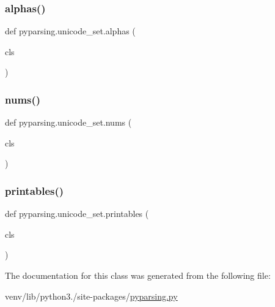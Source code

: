 \mbox{\label{classpyparsing_1_1unicode__set_aa9f08ce787c5c12b9a421680e743eacc}} 
\subsubsection{\texorpdfstring{alphas()}{alphas()}}
{\footnotesize\ttfamily def pyparsing.\+unicode\+\_\+set.\+alphas (\begin{DoxyParamCaption}\item[{}]{cls }\end{DoxyParamCaption})}

\mbox{\label{classpyparsing_1_1unicode__set_aa3dc7b989a48aff2851b04644537cb0a}} 
\subsubsection{\texorpdfstring{nums()}{nums()}}
{\footnotesize\ttfamily def pyparsing.\+unicode\+\_\+set.\+nums (\begin{DoxyParamCaption}\item[{}]{cls }\end{DoxyParamCaption})}

\mbox{\label{classpyparsing_1_1unicode__set_a5ee565396c830e2d84ad7226f230390d}} 
\subsubsection{\texorpdfstring{printables()}{printables()}}
{\footnotesize\ttfamily def pyparsing.\+unicode\+\_\+set.\+printables (\begin{DoxyParamCaption}\item[{}]{cls }\end{DoxyParamCaption})}



The documentation for this class was generated from the following file\+:\begin{DoxyCompactItemize}
\item 
venv/lib/python3./site-\/packages/\hyperlink{pyparsing_8py}{pyparsing.\+py}\end{DoxyCompactItemize}

